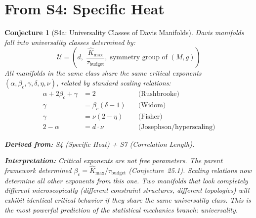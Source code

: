 \documentclass[11pt,letterpaper]{article}
\newtheorem{conjecture}{Conjecture}[section]
\newcommand{\Khat}{\hat{K}}
\newcommand{\tbudget}{\tau_{\mathrm{budget}}}
\begin{document}
\newpage
\section{From S4: Specific Heat}

\begin{conjecture}[S4a: Universality Classes of Davis 
Manifolds]\label{conj:universality}
Davis manifolds fall into universality classes determined by:
\begin{equation}
    \mathcal{U} = \left(d, \; \frac{\Khat_{\max}}{\tbudget}, \; 
    \text{symmetry group of } (M, g)\right)
\end{equation}
All manifolds in the same class share the same critical exponents 
$(\alpha, \beta_c, \gamma, \delta, \eta, \nu)$, related by standard 
scaling relations:
\begin{align}
    \alpha + 2\beta_c + \gamma &= 2 
    \quad &\text{(Rushbrooke)} \\
    \gamma &= \beta_c(\delta - 1) 
    \quad &\text{(Widom)} \\
    \gamma &= \nu(2 - \eta) 
    \quad &\text{(Fisher)} \\
    2 - \alpha &= d \cdot \nu 
    \quad &\text{(Josephson/hyperscaling)}
\end{align}

\textbf{Derived from:} S4 (Specific Heat) + S7 (Correlation Length).

\textbf{Interpretation:} Critical exponents are not free parameters. The 
parent framework determined $\beta_c = \Khat_{\max}/\tbudget$ 
(Conjecture~25.1). Scaling relations now determine all other exponents 
from this one. Two manifolds that look completely different microscopically 
(different constraint structures, different topologies) will exhibit 
identical critical behavior if they share the same universality class. 
This is the most powerful prediction of the statistical mechanics branch: 
\emph{universality}.
\end{conjecture}
\end{document}
